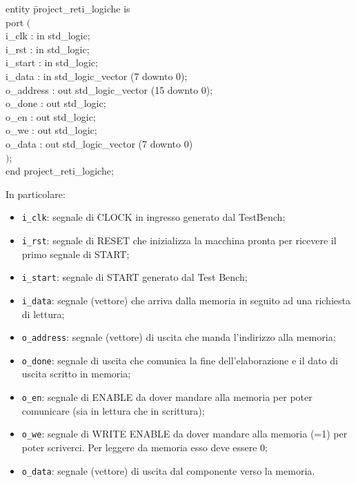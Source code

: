 \documentclass[12pt, table, xcdraw]{article}
\begin{document}
\begin{tabbing}
entity \= project\_reti\_logiche is \\
	\> port $($ \= \\
		\>\> i\_clk : in std\_logic; \\
		\>\> i\_rst : in std\_logic; \\
		\>\> i\_start : in std\_logic; \\ 
		\>\> i\_data : in std\_logic\_vector (7 downto 0); \\ 
		\>\> o\_address : out std\_logic\_vector (15 downto 0); \\ 
		\>\> o\_done : out std\_logic; \\
		\>\> o\_en : out std\_logic; \\ 
		\>\> o\_we : out std\_logic; \\ 
		\>\> o\_data : out std\_logic\_vector (7 downto 0) \\
	\>$)$; \\
end project\_reti\_logiche; \\

\end{tabbing}
In particolare:
\begin{itemize}
\item \texttt{i\_clk}: segnale di CLOCK in ingresso generato dal TestBench;
\item \texttt{i\_rst}: segnale di RESET che inizializza la macchina pronta per ricevere il primo
segnale di START;
\item \texttt{i\_start}: segnale di START generato dal Test Bench;
\item \texttt{i\_data}: segnale (vettore) che arriva dalla memoria in seguito ad una richiesta di
lettura;
\item \texttt{o\_address}: segnale (vettore) di uscita che manda l’indirizzo alla memoria;
\item \texttt{o\_done}: segnale di uscita che comunica la fine dell’elaborazione e il dato di uscita
scritto in memoria;
\item \texttt{o\_en}: segnale di ENABLE da dover mandare alla memoria per poter comunicare
(sia in lettura che in scrittura);
\item \texttt{o\_we}: segnale di WRITE ENABLE da dover mandare alla memoria (=1) per poter
scriverci. Per leggere da memoria esso deve essere 0;
\item \texttt{o\_data}: segnale (vettore) di uscita dal componente verso la memoria.


\end{itemize}
\end{document}
